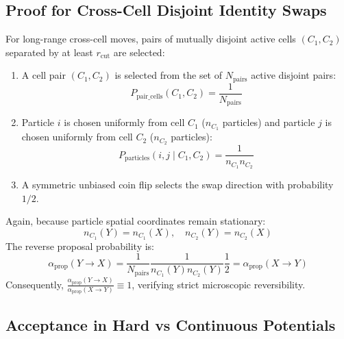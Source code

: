 \documentclass[11pt,a4paper]{article}
\begin{document}
\subsection{Proof for Cross-Cell Disjoint Identity Swaps}

For long-range cross-cell moves, pairs of mutually disjoint active cells $(C_1, C_2)$ separated by at least $r_{\text{cut}}$ are selected:
\begin{enumerate}
    \item A cell pair $(C_1, C_2)$ is selected from the set of $N_{\text{pairs}}$ active disjoint pairs:
    \begin{equation}
        P_{\text{pair\_cells}}(C_1, C_2) = \frac{1}{N_{\text{pairs}}}
    \end{equation}
    \item Particle $i$ is chosen uniformly from cell $C_1$ ($n_{C_1}$ particles) and particle $j$ is chosen uniformly from cell $C_2$ ($n_{C_2}$ particles):
    \begin{equation}
        P_{\text{particles}}(i, j \mid C_1, C_2) = \frac{1}{n_{C_1} n_{C_2}}
    \end{equation}
    \item A symmetric unbiased coin flip selects the swap direction with probability $1/2$.
\end{enumerate}

Again, because particle spatial coordinates remain stationary:
\begin{equation}
    n_{C_1}(Y) = n_{C_1}(X), \quad n_{C_2}(Y) = n_{C_2}(X)
\end{equation}
The reverse proposal probability is:
\begin{equation}
    \alpha_{\text{prop}}(Y \to X) = \frac{1}{N_{\text{pairs}}} \frac{1}{n_{C_1}(Y) n_{C_2}(Y)} \frac{1}{2} = \alpha_{\text{prop}}(X \to Y)
\end{equation}
Consequently, $\frac{\alpha_{\text{prop}}(Y \to X)}{\alpha_{\text{prop}}(X \to Y)} \equiv 1$, verifying strict microscopic reversibility.

\subsection{Acceptance in Hard vs Continuous Potentials}
\end{document}
